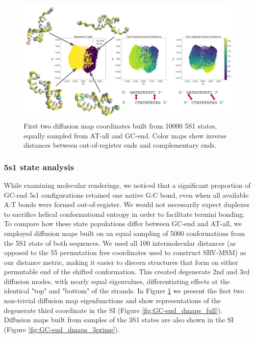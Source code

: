 \documentclass[journal=jpcbfk,manuscript=article]{achemso}
\begin{document}
\begin{figure}[ht!]
	\begin{center}
        \includegraphics[width=\textwidth]{Figs/figs_imp/GC-end_dmaps.PNG}
        \caption{First two diffusion map coordinates built from 10000 5S1 states, equally sampled from AT-all and GC-end. Color maps show inverse distances between out-of-register ends and complementary ends.}
        \label{fig:GC-end_dmaps}
	\end{center}
\end{figure}

\subsubsection{5s1 state analysis}
While examining molecular renderings, we noticed that a significant proportion of GC-end 5s1 configurations retained one native G:C bond, even when all available A:T bonds were formed out-of-register. We would not necessarily expect duplexes to sacrifice helical conformational entropy in order to facilitate termini bonding. To compare how these state populations differ between GC-end and AT-all, we employed diffusion maps built on an equal sampling of 5000 conformations from the 5S1 state of both sequences. We used all 100 intermolecular distances (as opposed to the 55 permutation free coordinates used to construct SRV-MSM) as our distance metric, making it easier to discern structures that form on either permutable end of the shifted conformation. This created degenerate 2nd and 3rd diffusion modes, with nearly equal eigenvalues, differentiating effects at the identical "top" and "bottom" of the strands. In Figure \ref{fig:GC-end_dmaps} we present the first two non-trivial diffusion map eigenfunctions and show representations of the degenerate third coordinate in the SI (Figure \ref{fig:GC-end_dmaps_full}). Diffusion maps built from samples of the 3S1 states are also shown in the SI (Figure \ref{fig:GC-end_dmaps_3prime}). 
\end{document}
